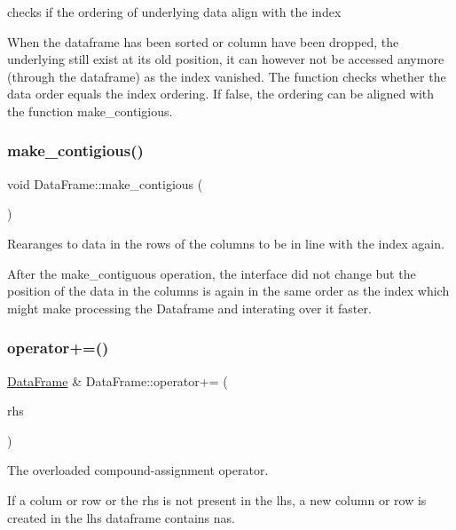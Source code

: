 checks if the ordering of underlying data align with the index 

When the dataframe has been sorted or column have been dropped, the underlying still exist at its old position, it can however not be accessed anymore (through the dataframe) as the index vanished. The function checks whether the data order equals the index ordering. If false, the ordering can be aligned with the function {\ttfamily make\+\_\+contigious}. \mbox{\label{classDataFrame_a7a1b7c79f2b98e18ed5cda2852dd5341}} 
\subsubsection{\texorpdfstring{make\+\_\+contigious()}{make\_contigious()}}
{\footnotesize\ttfamily void Data\+Frame\+::make\+\_\+contigious (\begin{DoxyParamCaption}{ }\end{DoxyParamCaption})}



Rearanges to data in the rows of the columns to be in line with the index again. 

After the make\+\_\+contiguous operation, the interface did not change but the position of the data in the columns is again in the same order as the index which might make processing the Dataframe and interating over it faster. \mbox{\label{classDataFrame_a61f3301cc72548b4b3536c0844fb156d}} 
\subsubsection{\texorpdfstring{operator+=()}{operator+=()}}
{\footnotesize\ttfamily \hyperlink{classDataFrame}{Data\+Frame} \& Data\+Frame\+::operator+= (\begin{DoxyParamCaption}\item[{const \hyperlink{classDataFrame}{Data\+Frame} \&}]{rhs }\end{DoxyParamCaption})}



The overloaded compound-\/assignment operator. 

If a colum or row or the rhs is not present in the lhs, a new column or row is created in the lhs dataframe contains nas. 

